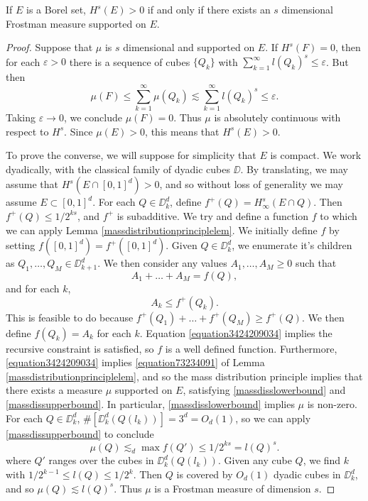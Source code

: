 \begin{lemma}
	If $E$ is a Borel set, $H^s(E) > 0$ if and only if there exists an $s$ dimensional Frostman measure supported on $E$.
\end{lemma}
\begin{proof}
	Suppose that $\mu$ is $s$ dimensional and supported on $E$. If $H^s(F) = 0$, then for each $\varepsilon > 0$ there is a sequence of cubes $\{ Q_k \}$ with $\sum_{k = 1}^\infty l(Q_k)^s \leq \varepsilon$. But then
	\[ \mu(F) \leq \sum_{k = 1}^\infty \mu(Q_k) \lesssim \sum_{k = 1}^\infty l(Q_k)^s \leq \varepsilon. \]
	Taking $\varepsilon \to 0$, we conclude $\mu(F) = 0$. Thus $\mu$ is absolutely continuous with respect to $H^s$. Since $\mu(E) > 0$, this means that $H^s(E) > 0$.

	To prove the converse, we will suppose for simplicity that $E$ is compact. We work dyadically, with the classical family of dyadic cubes $\DD$.  By translating, we may assume that $H^s(E \cap [0,1]^d) > 0$, and so without loss of generality we may assume $E \subset [0,1]^d$. For each $Q \in \DD_k^d$, define $f^+(Q) = H^s_\infty(E \cap Q)$. Then $f^+(Q) \leq 1/2^{ks}$, and $f^+$ is subadditive. We try and define a function $f$ to which we can apply Lemma \ref{massdistributionprinciplelem}. We initially define $f$ by setting $f([0,1]^d) = f^+([0,1]^d)$. Given $Q \in \DD_k^d$, we enumerate it's children as $Q_1, \dots, Q_M \in \DD_{k+1}^d$. We then consider any values $A_1, \dots, A_M \geq 0$ such that
  	\begin{equation} \label{equation3424209034}
  		A_1 + \dots + A_M = f(Q),
  	\end{equation}
  	and for each $k$,
  	\begin{equation} \label{equation12039123012}
  		A_k \leq f^+(Q_k).
  	\end{equation}
	This is feasible to do because $f^+(Q_1) + \dots + f^+(Q_M) \geq f^+(Q)$. We then define $f(Q_k) = A_k$ for each $k$. Equation \eqref{equation3424209034} implies the recursive constraint is satisfied, so $f$ is a well defined function. Furthermore, \eqref{equation3424209034} implies \eqref{equation73234091} of Lemma \ref{massdistributionprinciplelem}, and so the mass distribution principle implies that there exists a measure $\mu$ supported on $E$, satisfying \eqref{massdisslowerbound} and \eqref{massdissupperbound}. In particular, \eqref{massdisslowerbound} implies $\mu$ is non-zero. For each $Q \in \DD_k^d$, $\#[\DD_k^d(Q(l_k))] = 3^d = O_d(1)$, so we can apply \eqref{massdissupperbound} to conclude
	\[ \mu(Q) \lesssim_d \max f(Q') \leq 1/2^{ks} = l(Q)^s. \]
	where $Q'$ ranges over the cubes in $\DD_k^d(Q(l_k))$. Given any cube $Q$, we find $k$ with $1/2^{k-1} \leq l(Q) \leq 1/2^k$. Then $Q$ is covered by $O_d(1)$ dyadic cubes in $\DD_k^d$, and so $\mu(Q) \lesssim l(Q)^s$. Thus $\mu$ is a Frostman measure of dimension $s$.
\end{proof}

